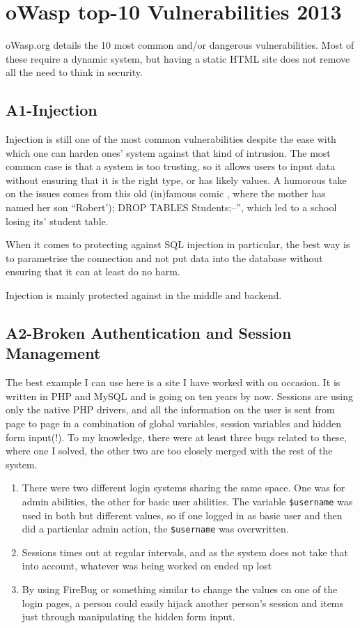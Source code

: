 \section{oWasp top-10 Vulnerabilities 2013}
\label{sec:owasp2013}
\noindent
oWasp.org \citep{oWasp2013t10} details the 10 most common and/or dangerous vulnerabilities. Most of these require a dynamic system, but having a static HTML site does not remove all the need to think in security. 

\subsection{A1-Injection}
\noindent
Injection is still one of the most common vulnerabilities despite the ease with which one can harden ones' system against that kind of intrusion. The most common case is that a system is too trusting, so it allows users to input data without ensuring that it is the right type, or has likely values. A humorous take on the issues comes from this old (in)famous comic \citep{XKCDBobbyTables}, where the mother has named her son ``Robert'); DROP TABLES Students;--'', which led to a school losing its' student table. 

When it comes to protecting against SQL injection in particular, the best way is to parametrise the connection and not put data into the database without ensuring that it can at least do no harm.

Injection is mainly protected against in the middle and backend.

\subsection{A2-Broken Authentication and Session Management}
\noindent
The best example I can use here is a site I have worked with on occasion. It is written in PHP and MySQL and is going on ten years by now. Sessions are using only the native PHP drivers, and all the information on the user is sent from page to page in a combination of global variables, session variables and hidden form input(!). To my knowledge, there were at least three bugs related to these, where one I solved, the other two are too closely merged with the rest of the system.

\begin{enumerate}
\item There were two different login systems sharing the same space. One was for admin abilities, the other for basic user abilities. The variable \texttt{\$username} was used in both but different values, so if one logged in as basic user and then did a particular admin action, the \texttt{\$username} was overwritten.
\item Sessions times out at regular intervals, and as the system does not take that into account, whatever was being worked on ended up lost
\item By using FireBug or something similar to change the values on one of the login pages, a person could easily hijack another person's session and items just through manipulating the hidden form input.
\end{enumerate}

